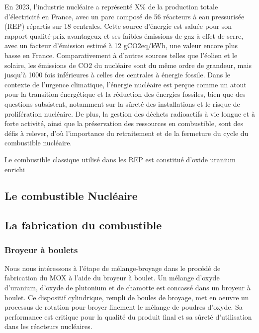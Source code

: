 En 2023, l'industrie nucléaire a représenté X\% de la production totale d'électricité en France, avec un parc composé de 56 réacteurs à eau pressurisée (REP) répartis sur 18 centrales. Cette source d'énergie est saluée pour son rapport qualité-prix avantageux et ses faibles émissions de gaz à effet de serre, avec un facteur d'émission estimé à 12 gCO2eq/kWh, une valeur encore plus basse en France. Comparativement à d'autres sources telles que l'éolien et le solaire, les émissions de CO2 du nucléaire sont du même ordre de grandeur, mais jusqu'à 1000 fois inférieures à celles des centrales à énergie fossile. Dans le contexte de l'urgence climatique, l'énergie nucléaire est perçue comme un atout pour la transition énergétique et la réduction des énergies fossiles, bien que des questions subsistent, notamment sur la sûreté des installations et le risque de prolifération nucléaire. De plus, la gestion des déchets radioactifs à vie longue et à forte activité, ainsi que la préservation des ressources en combustible, sont des défis à relever, d'où l'importance du retraitement et de la fermeture du cycle du combustible nucléaire.

Le combustible classique utilisé dans les REP est constitué d'oxide uranium enrichi
\subsection{Le combustible Nucléaire}

\subsection{La fabrication du combustible}

\subsubsection{Broyeur à boulets}



Nous nous intéressons à l'étape de mélange-broyage dans le procédé de fabrication du MOX à l'aide du broyeur à boulet. Un mélange d'oxyde d'uranium, d'oxyde de plutonium et de chamotte est concassé dans un broyeur à boulet. Ce dispositif cylindrique, rempli de boules de broyage, met en oeuvre un processus de rotation pour broyer finement le mélange de poudres d'oxyde. Sa performance est critique pour la qualité du produit final et sa sûreté d'utilisation dans les réacteurs nucléaires.


